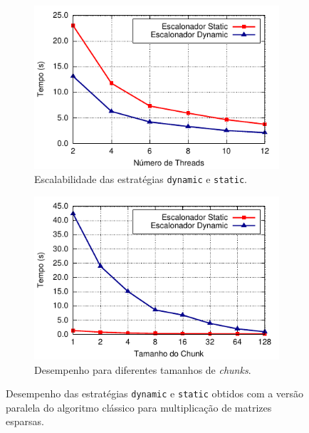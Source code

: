 \documentclass{SBCbookchapter}
\begin{document}
		\begin{figure}[t]
			\captionsetup[subfigure]{justification=centering}
			\centering
				\begin{subfigure}{0.47\linewidth}
					\includegraphics[width=\linewidth]{img/smm}
					\caption{Escalabilidade das estratégias \texttt{dynamic} e \texttt{static}.}
					\label{fig:static-dynamic-guided}
				\end{subfigure}
				\quad
				\begin{subfigure}{0.47\linewidth}
					\includegraphics[width=\linewidth]{img/chunk-size}
					\caption{Desempenho para diferentes tamanhos de
					\textit{chunks}.}
					\label{fig:chunk-size}
				\end{subfigure}
			\caption{Desempenho das estratégias \texttt{dynamic} e \texttt{static} obtidos com a versão paralela
			do algoritmo clássico para multiplicação de matrizes esparsas.}
		\end{figure}
\end{document}
